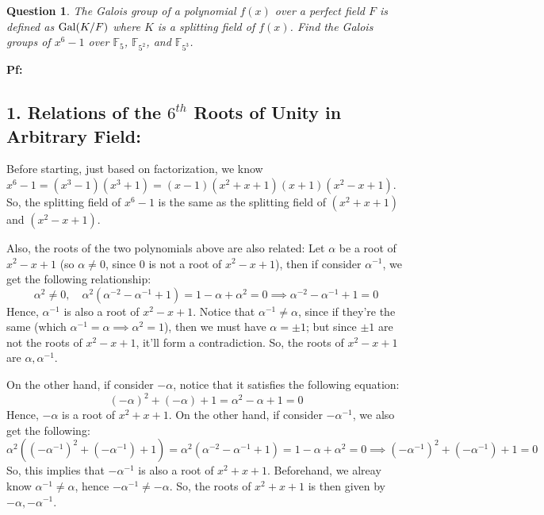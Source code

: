 \documentclass{article}
\newtheorem{question}{Question}
\newcommand{\FF}{\mathbb{F}}
\newcommand{\Gal}{\textmd{Gal}}
\begin{document}
\break

\section{}%
\begin{question}\label{q5}
    The Galois group of a polynomial $f(x)$ over a perfect field $F$ is defined as $\Gal(K/F)$ where $K$ is a splitting field of $f(x)$. Find the Galois groups of $x^6-1$ over $\FF_5$, $\FF_{5^2}$, and $\FF_{5^3}$.
\end{question}

\textbf{Pf:}

\subsection*{1. Relations of the $6^{th}$ Roots of Unity in Arbitrary Field:}
Before starting, just based on factorization, we know $x^6-1 = (x^3-1)(x^3+1) = (x-1)(x^2+x+1)(x+1)(x^2-x+1)$. So, the splitting field of $x^6-1$ is the same as the splitting field of $(x^2+x+1)$ and $(x^2-x+1)$.

Also, the roots of the two polynomials above are also related: Let $\alpha$ be a root of $x^2-x+1$ (so $\alpha\neq 0$, since $0$ is not a root of $x^2-x+1$),  then if consider $\alpha^{-1}$, we get the following relationship:
\begin{equation}
    \label{eq:8}
    \alpha^2\neq 0,\quad \alpha^2(\alpha^{-2}-\alpha^{-1}+1) = 1-\alpha+\alpha^2 = 0\implies \alpha^{-2}-\alpha^{-1}+1 = 0
\end{equation}
Hence, $\alpha^{-1}$ is also a root of $x^2-x+1$. Notice that $\alpha^{-1}\neq \alpha$, since if they're the same (which $\alpha^{-1}=\alpha\implies \alpha^2=1$), then we must have $\alpha=\pm 1$; but since $\pm 1$ are not the roots of $x^2-x+1$, it'll form a contradiction. So, the roots of $x^2-x+1$ are $\alpha,\alpha^{-1}$.

On the other hand, if consider $-\alpha$, notice that it satisfies the following equation:
\begin{equation}
    \label{eq:9}
    (-\alpha)^2 + (-\alpha)+1 = \alpha^2-\alpha+1=0
\end{equation}
Hence, $-\alpha$ is a root of $x^2+x+1$. On the other hand, if consider $-\alpha^{-1}$, we also get the following:
\begin{equation}
    \label{eq:10}
    \alpha^2((-\alpha^{-1})^2+(-\alpha^{-1})+1) = \alpha^2(\alpha^{-2}-\alpha^{-1}+1) = 1-\alpha+\alpha^2 = 0 \implies (-\alpha^{-1})^2+(-\alpha^{-1})+1=0
\end{equation}
So, this implies that $-\alpha^{-1}$ is also a root of $x^2+x+1$. Beforehand, we alreay know $\alpha^{-1}\neq \alpha$, hence $-\alpha^{-1}\neq -\alpha$. So, the roots of $x^2+x+1$ is then given by $-\alpha,-\alpha^{-1}$.
\end{document}

